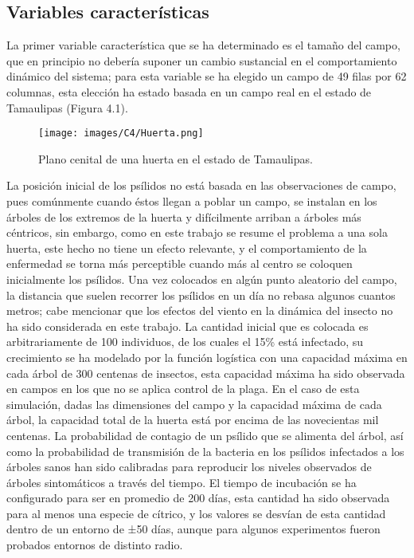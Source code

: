 \subsection{Variables características}
La primer variable característica que se ha determinado es el tamaño del campo, que en principio no debería suponer un cambio sustancial en el comportamiento dinámico del sistema; para esta variable se ha elegido un campo de 49 filas por 62 columnas, esta elección ha estado basada en un campo real en el estado de Tamaulipas (Figura 4.1).\\
\begin{figure}[H]
\centering
\texttt{[image: images/C4/Huerta.png]}
\caption{Plano cenital de una huerta en el estado de Tamaulipas.}
\end{figure}
La posición inicial de los psílidos no está basada en las observaciones de campo, pues comúnmente cuando éstos llegan a poblar un campo, se instalan en los árboles de los extremos de la huerta y difícilmente arriban a árboles más céntricos, sin embargo, como en este trabajo se resume el problema a una sola huerta, este hecho no tiene un efecto relevante, y el comportamiento de la enfermedad se torna más perceptible cuando más al centro se coloquen inicialmente los psílidos. Una vez colocados en algún punto aleatorio del campo, la distancia que suelen recorrer los psílidos en un día no rebasa algunos cuantos metros; cabe mencionar que los efectos del viento en la dinámica del insecto no ha sido considerada en este trabajo. La cantidad inicial que es colocada es arbitrariamente de 100 individuos, de los cuales el 15\% está infectado, su crecimiento se ha modelado por la función logística con una capacidad máxima en cada árbol de 300 centenas de insectos, esta capacidad máxima ha sido observada en campos en los que no se aplica control de la plaga. En el caso de esta simulación, dadas las dimensiones del campo y la capacidad máxima de cada árbol, la capacidad total de la huerta está por encima de las novecientas mil centenas. La probabilidad de contagio de un psílido que se alimenta del árbol, así como la probabilidad de transmisión de la bacteria en los psílidos infectados a los árboles sanos han sido calibradas para reproducir los niveles observados de árboles sintomáticos a través del tiempo. El tiempo de incubación se ha configurado para ser en promedio de 200 días, esta cantidad ha sido observada para al menos una especie de cítrico, y los valores se desvían de esta cantidad dentro de un entorno de ±50 días, aunque para algunos experimentos fueron probados entornos de distinto radio.

